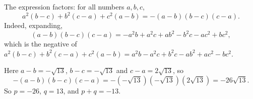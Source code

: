 The expression factors: for all numbers $a,b,c$,
\[a^2(b-c)+b^2(c-a)+c^2(a-b)=-(a-b)(b-c)(c-a).\]
Indeed, expanding,
\[(a-b)(b-c)(c-a)=-a^2b+a^2c+ab^2-b^2c-ac^2+bc^2,\]
which is the negative of $a^2(b-c)+b^2(c-a)+c^2(a-b)=a^2b-a^2c+b^2c-ab^2+ac^2-bc^2$.

Here $a-b=-\sqrt{13}$, $b-c=-\sqrt{13}$ and $c-a=2\sqrt{13}$, so
\[-(a-b)(b-c)(c-a)=-\left(-\sqrt{13}\right)\left(-\sqrt{13}\right)\left(2\sqrt{13}\right)=-26\sqrt{13}.\]
So $p=-26$, $q=13$, and $p+q=\boxed{-13}$.
